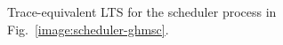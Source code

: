 \begin{figure}\centering
{}
\caption{Trace-equivalent LTS for the scheduler process in Fig.~\ref{image:scheduler-ghmsc}.\label{image:scheduler-lts}}
\end{figure}

